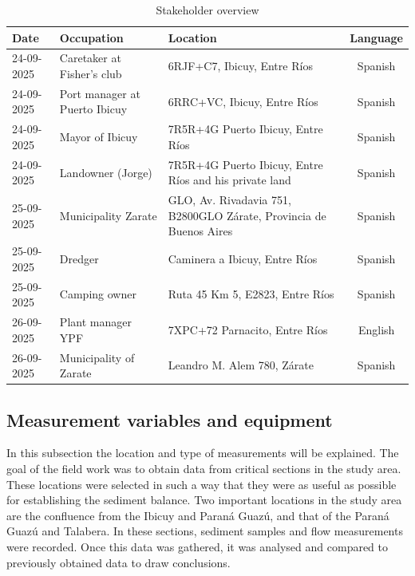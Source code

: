 \begin{table}[H]
    \centering
    \renewcommand{\arraystretch}{1.2}
    \setlength{\tabcolsep}{4pt}
    \begin{tabularx}{\textwidth}{l l X c}
        \toprule
        \textbf{Date} & \textbf{Occupation} & \textbf{Location} & \textbf{Language} \\
        \midrule
        24-09-2025 & Caretaker at Fisher's club & 6RJF+C7, Ibicuy, Entre Ríos & Spanish \\
        24-09-2025 & Port manager at Puerto Ibicuy & 6RRC+VC, Ibicuy, Entre Ríos & Spanish \\
        24-09-2025 & Mayor of Ibicuy & 7R5R+4G Puerto Ibicuy, Entre Ríos & Spanish \\
        24-09-2025 & Landowner (Jorge) & 7R5R+4G Puerto Ibicuy, Entre Ríos and his private land & Spanish \\
        25-09-2025 & Municipality Zarate & GLO, Av. Rivadavia 751, B2800GLO Zárate, Provincia de Buenos Aires & Spanish \\
        25-09-2025 & Dredger & Caminera a Ibicuy, Entre Ríos & Spanish \\
        25-09-2025 & Camping owner & Ruta 45 Km 5, E2823, Entre Ríos & Spanish \\
        26-09-2025 & Plant manager YPF & 7XPC+72 Parnacito, Entre Ríos & English \\
        26-09-2025 & Municipality of Zarate & Leandro M. Alem 780, Zárate & Spanish \\
        \bottomrule
    \end{tabularx}
    \caption{Stakeholder overview}
    \label{tab:stakeholders}
\end{table}

\subsection{Measurement variables and equipment}
In this subsection the location and type of measurements will be explained. The goal of the field work was to obtain data from critical sections in the study area. These locations were selected in such a way that they were as useful as possible for establishing the sediment balance. Two important locations in the study area are the confluence from the Ibicuy and Paraná Guazú, and that of the Paraná Guazú and Talabera. In these sections, sediment samples and flow measurements were recorded.
Once this data was gathered, it was analysed and compared to previously obtained data to draw conclusions. 



